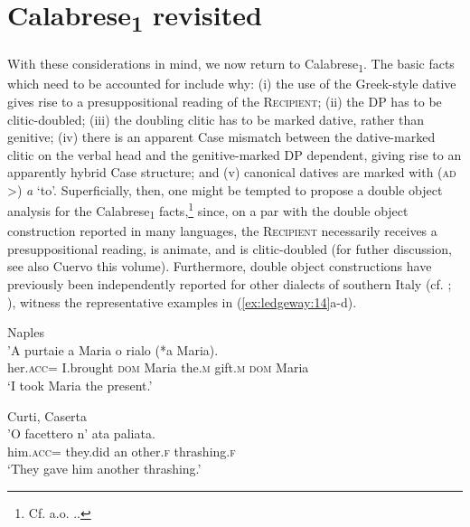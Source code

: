 \documentclass[output=paper,modfonts,nonflat,colorlinks,citecolor=brown]{langsci/langscibook}
\begin{document}
\section{Calabrese\textsubscript{1} revisited}

With these considerations in mind, we now return to Calabrese\textsubscript{1}. The basic facts which need to be accounted for include why: (i) the use of the Greek-style dative gives rise to a presuppositional reading of the \textsc{Recipient}; (ii) the DP has to be clitic-doubled; (iii) the doubling clitic has to be marked dative, rather than genitive; (iv) there is an apparent Case mismatch between the dative-marked clitic on the verbal head and the genitive-marked DP dependent, giving rise to an apparently hybrid Case structure; and (v) canonical datives are marked with (\textsc{ad} >) \textit{a} ‘to’. Superficially, then, one might be tempted to propose a double object analysis for the Calabrese\textsubscript{1} facts,\footnote{Cf. a.o. \citet{BarssLasnik1986,Larson1988, Larson1990,Jackendoff1990,CollinsThráinsson1993,Marantz1993,Demonte1995,Pesetsky1995,Collins1997,Torrego1998,Harley2002,Pyllkänen2008,Anagnostopoulou2003,Cuervo2003,Jeong2007,Bruening2010DOC, Bruening2010Ditrans,OrmazabalRomero2010,HarleyJung2015,Pineda2016}..} since, on a par with the double object construction reported in many languages, the \textsc{Recipient} necessarily receives a presuppositional reading, is animate, and is clitic-doubled (for futher discussion, see also Cuervo this volume). Furthermore, double object constructions have previously been independently reported for other dialects of southern Italy (cf. \citealt[ch.2]{Ledgeway2000}; \citealt[844-847]{Ledgeway2009}), witness the representative examples in (\ref{ex:ledgeway:14}a-d). 

\ea\label{ex:ledgeway:14}
\ea Naples\\

\gll ’A  purtaie  a  Maria  o  rialo  (*a  Maria).\\
    her.\textsc{acc}=  I.brought  \textsc{dom}  Maria  the.\textsc{m}  gift.\textsc{m}    \textsc{dom}  Maria\\
    \glt `I took Maria the present.'

\ex Curti, Caserta\\
    \gll ’O  facettero  n’  ata  paliata.\\
    him.\textsc{acc}=  they.did  an  other.\textsc{f}  thrashing.\textsc{f}\\
    \glt `They gave him another thrashing.'
\end{document}
